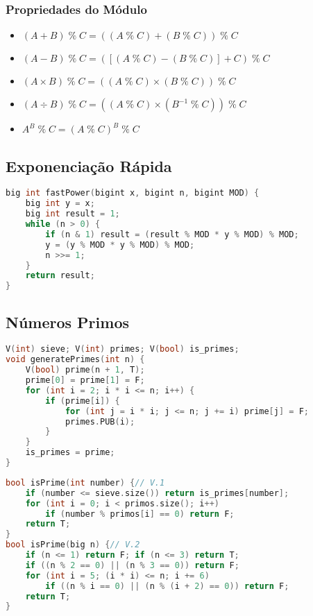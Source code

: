 \subsubsection*{Propriedades do Módulo}
\begin{itemize}
	\item $\left(A + B\right) \;\%\; C = 
	      \left(\left(A \;\%\; C\right) + 
	      \left(B \;\%\; C\right)\right) \;\%\; C$
	\item $\left(A - B\right) \;\%\; C = 
	      \left(\left[\left(A \;\%\; C\right) -
	      \left(B \;\%\; C\right)\right] + C\right) \;\%\; C$
	\item $\left(A \times B\right) \;\%\; C = 
	      \left(\left(A \;\%\; C\right) \times
	      \left(B \;\%\; C\right)\right) \;\%\; C$
	\item $\left(A \div B\right) \;\%\; C = 
	      \left(\left(A \;\%\; C\right) \times
	      \left(B^{-1} \;\%\; C\right)\right) \;\%\; C$
	\item $A^{B} \;\%\; C = \left(A \;\%\; C\right)^{B} \;\%\; C$
\end{itemize}

\subsection{Exponenciação Rápida}
\begin{lstlisting}[language=C++]
big int fastPower(bigint x, bigint n, bigint MOD) {
    big int y = x;
    big int result = 1;
    while (n > 0) {
        if (n & 1) result = (result % MOD * y % MOD) % MOD;
        y = (y % MOD * y % MOD) % MOD;
        n >>= 1;
    }
    return result;
}
\end{lstlisting}

\subsection{Números Primos}
\begin{lstlisting}[language = C++, title=Crivo de Eratóstenes]
V(int) sieve; V(int) primes; V(bool) is_primes;
void generatePrimes(int n) {
    V(bool) prime(n + 1, T);
    prime[0] = prime[1] = F;
    for (int i = 2; i * i <= n; i++) {
        if (prime[i]) {
            for (int j = i * i; j <= n; j += i) prime[j] = F;
            primes.PUB(i);
        }
    }
    is_primes = prime;
}
\end{lstlisting}

\newpage

\begin{lstlisting}[language = C++,title=Teste de Primalidade (Determinístico)]
bool isPrime(int number) {// V.1
    if (number <= sieve.size()) return is_primes[number];
    for (int i = 0; i < primos.size(); i++)
        if (number % primos[i] == 0) return F;
    return T;
}
bool isPrime(big n) {// V.2
	if (n <= 1) return F; if (n <= 3) return T;
    if ((n % 2 == 0) || (n % 3 == 0)) return F;
    for (int i = 5; (i * i) <= n; i += 6)
        if ((n % i == 0) || (n % (i + 2) == 0)) return F;
    return T;
}
\end{lstlisting}

